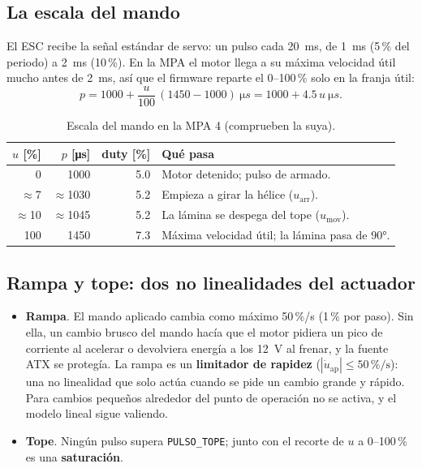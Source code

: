 \documentclass[11pt,letterpaper]{article}
\begin{document}
\subsection{La escala del mando}\label{sec:escala}

El ESC recibe la señal estándar de servo: un pulso cada \SI{20}{ms}, de \SI{1}{ms} (5\,\% del periodo) a \SI{2}{ms} (10\,\%). En la MPA el motor llega a su máxima velocidad útil mucho antes de \SI{2}{ms}, así que el firmware reparte el 0--100\,\% solo en la franja útil:
\begin{equation}
p = 1000 + \frac{u}{100}\,(1450-1000)\ \si{\micro s} = 1000 + 4.5\,u\ \si{\micro s}.
\label{eq:escala}
\end{equation}

\begin{table}[H]\centering\small
\caption{Escala del mando en la MPA 4 (comprueben la suya).}\label{tab:escala}
\begin{tabular}{@{}r r r >{\raggedright\arraybackslash}p{7cm}@{}}\toprule
$u$ [\%] & $p$ [\si{\micro s}] & duty [\%] & Qué pasa\\\midrule
0 & 1000 & 5.0 & Motor detenido; pulso de armado.\\
$\approx$7 & $\approx$1030 & 5.2 & Empieza a girar la hélice ($u_\text{arr}$).\\
$\approx$10 & $\approx$1045 & 5.2 & La lámina se despega del tope ($u_\text{mov}$).\\
100 & 1450 & 7.3 & Máxima velocidad útil; la lámina pasa de 90°.\\\bottomrule
\end{tabular}
\end{table}

\subsection{Rampa y tope: dos no linealidades del actuador}\label{sec:rampa}

\begin{itemize}[leftmargin=12pt]
  \item \textbf{Rampa}. El mando aplicado cambia como máximo 50\,\%/s (1\,\% por paso). Sin ella, un cambio brusco del mando hacía que el motor pidiera un pico de corriente al acelerar o devolviera energía a los 12~V al frenar, y la fuente ATX se protegía. La rampa es un \textbf{limitador de rapidez} ($|\dot u_\text{ap}|\le 50\,\%/\text{s}$): una no linealidad que solo actúa cuando se pide un cambio grande y rápido. Para cambios pequeños alrededor del punto de operación no se activa, y el modelo lineal sigue valiendo.
  \item \textbf{Tope}. Ningún pulso supera \texttt{PULSO\_TOPE}; junto con el recorte de $u$ a 0--100\,\% es una \textbf{saturación}.
\end{itemize}
\end{document}
